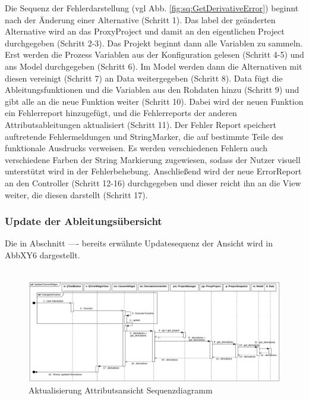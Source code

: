 \documentclass{article}
\begin{document}
Die Sequenz der Fehlerdarstellung (vgl Abb. \ref{fig:sq:GetDerivativeError}) beginnt nach der Änderung einer Alternative (Schritt 1). Das label der geänderten Alternative wird an das ProxyProject und damit an den eigentlichen Project durchgegeben (Schritt 2-3). Das Projekt beginnt dann alle Variablen zu sammeln. Erst werden die Prozess Variablen aus der Konfiguration gelesen (Schritt 4-5) und ans Model durchgegeben (Schritt 6). Im Model werden dann die Alternativen mit diesen vereinigt (Schritt 7) an Data weitergegeben (Schritt 8). Data fügt die Ableitungsfunktionen und die Variablen aus den Rohdaten hinzu (Schritt 9) und gibt alle an die neue Funktion weiter (Schritt 10). Dabei wird der neuen Funktion ein Fehlerreport hinzugefügt, und die Fehlerreports der anderen Attributsableitungen aktualisiert (Schritt 11). Der Fehler Report speichert auftretende Fehlermeldungen und StringMarker, die auf bestimmte Teile des funktionale Ausdrucks verweisen. Es werden verschiedenen Fehlern auch verschiedene Farben der String Markierung zugewiesen, sodass der Nutzer visuell unterstützt wird in der Fehlerbehebung. Anschließend wird der neue ErrorReport an den Controller (Schritt 12-16) durchgegeben und dieser reicht ihn an die View weiter, die diesen darstellt (Schritt 17).

\subsubsection{Update der Ableitungsübersicht}\label{sec:Update der Ableitungsübersicht}
Die in Abschnitt ---- bereits erwähnte Updatesequenz der Ansicht wird in AbbXY6 dargestellt. \\\\

\begin{figure}[H]%
    \centering
    \includegraphics[width=13cm]{entwurf/Floriane/UpdateColumnWidget.png}
    \caption{Aktualisierung Attributsansicht Sequenzdiagramm}
\end{figure}
\end{document}
